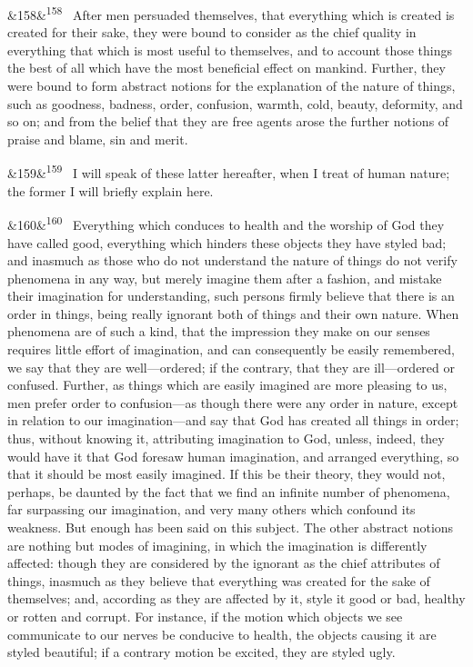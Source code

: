 \documentclass[12pt]{article}
\newcommand{\para}[1][]{\par\noindent\ifx&#1&\else\textsuperscript{\footnotesize #1}~\fi}
\begin{document}
\para[158] After men persuaded themselves, that everything which is created is created for their sake, they were bound to consider as the chief quality in everything that which is most useful to themselves, and to account those things the best of all which have the most beneficial effect on mankind. Further, they were bound to form abstract notions for the explanation of the nature of things, such as goodness, badness, order, confusion, warmth, cold, beauty, deformity, and so on; and from the belief that they are free agents arose the further notions of praise and blame, sin and merit.

\para[159] I will speak of these latter hereafter, when I treat of human nature; the former I will briefly explain here.

\para[160] Everything which conduces to health and the worship of God they have called good, everything which hinders these objects they have styled bad; and inasmuch as those who do not understand the nature of things do not verify phenomena in any way, but merely imagine them after a fashion, and mistake their imagination for understanding, such persons firmly believe that there is an order in things, being really ignorant both of things and their own nature. When phenomena are of such a kind, that the impression they make on our senses requires little effort of imagination, and can consequently be easily remembered, we say that they are well---ordered; if the contrary, that they are ill---ordered or confused. Further, as things which are easily imagined are more pleasing to us, men prefer order to confusion---as though there were any order in nature, except in relation to our imagination---and say that God has created all things in order; thus, without knowing it, attributing imagination to God, unless, indeed, they would have it that God foresaw human imagination, and arranged everything, so that it should be most easily imagined. If this be their theory, they would not, perhaps, be daunted by the fact that we find an infinite number of phenomena, far surpassing our imagination, and very many others which confound its weakness. But enough has been said on this subject. The other abstract notions are nothing but modes of imagining, in which the imagination is differently affected: though they are considered by the ignorant as the chief attributes of things, inasmuch as they believe that everything was created for the sake of themselves; and, according as they are affected by it, style it good or bad, healthy or rotten and corrupt. For instance, if the motion which objects we see communicate to our nerves be conducive to health, the objects causing it are styled beautiful; if a contrary motion be excited, they are styled ugly.
\end{document}
